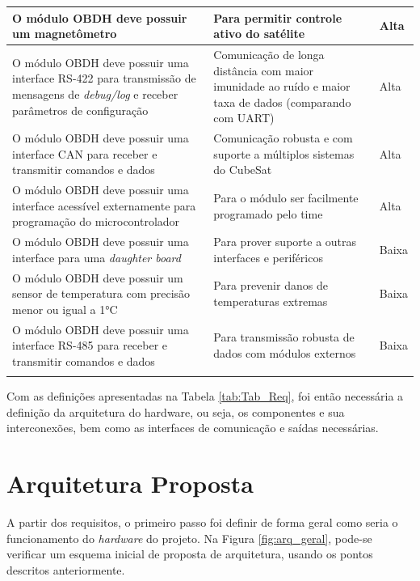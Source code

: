 \begin{longtable}{@{}p{5cm}p{5cm}p{3.5cm}@{}}
       \hline
        O módulo OBDH deve possuir um magnetômetro & Para permitir controle ativo do satélite  & Alta \tabularnewline

        \hline
        O módulo OBDH deve possuir uma interface RS-422 para transmissão de mensagens de \textit{debug/log} e receber parâmetros de configuração & Comunicação de longa distância com maior imunidade ao ruído e maior taxa de dados (comparando com UART)  & Alta \tabularnewline

       \hline
        O módulo OBDH deve possuir uma interface CAN para receber e transmitir comandos e dados & Comunicação robusta e com suporte a múltiplos sistemas do CubeSat  & Alta\tabularnewline

        \hline
        O módulo OBDH deve possuir uma interface acessível externamente para programação do microcontrolador & Para o módulo ser facilmente programado pelo time  & Alta \tabularnewline

        \hline
        O módulo OBDH deve possuir uma interface para uma \textit{daughter board} & Para prover suporte a outras interfaces e periféricos  & Baixa \tabularnewline

        \hline
        O módulo OBDH deve possuir um sensor de temperatura com precisão menor ou igual a 1°C & Para prevenir danos de temperaturas extremas & Baixa\tabularnewline

        \hline
        O módulo OBDH deve possuir uma interface RS-485 para receber e transmitir comandos e dados  & Para transmissão robusta de dados com módulos externos & Baixa \tabularnewline
       \hline
	\centering{\fonte{Elaboração própria.}}
\end{longtable}

Com as definições apresentadas na Tabela \ref{tab:Tab_Req}, foi então necessária a definição da arquitetura do hardware, ou seja, os componentes e sua interconexões, bem como as interfaces de comunicação e saídas necessárias.

\section{Arquitetura Proposta}

A partir dos requisitos, o primeiro passo foi definir de forma geral como seria o funcionamento do \textit{hardware} do projeto. Na Figura \ref{fig:arq_geral}, pode-se verificar um esquema inicial de proposta de arquitetura, usando os pontos descritos anteriormente.

